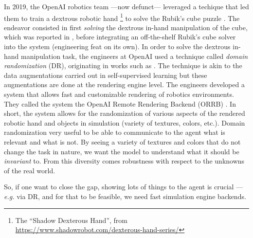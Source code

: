 \documentclass[12pt,a4paper]{article}
\begin{document}
In 2019, the OpenAI robotics team ---now defunct--- leveraged a techique that led
them to train a dextrous robotic hand \footnote{The ``Shadow Dexterous Hand'', from
\url{https://www.shadowrobot.com/dexterous-hand-series/}}
to solve the Rubik's cube puzzle \cite{OpenAI2019-vy}.
The endeavor consisted in first \textit{solving} the dextrous in-hand manipulation of the cube,
which was reported in \cite{OpenAI2018-sm}, before integrating an off-the-shelf Rubik's cube
solver into the system (engineering feat on its own).
In order to solve the dextrous in-hand manipulation task, the engineers at OpenAI used a
technique called \emph{domain randomization} (DR), originating in works such as
\cite{Tobin2017-ir, Tan2018-ux}.
The technique is akin to the data augmentations carried out in self-supervised learning
but these augmentations are done at the rendering engine level. The engineers developed a
system that allows fast and customizable rendering of robotics environments. They called the
system the OpenAI Remote Rendering Backend (ORRB) \cite{Chociej2019-ot}.
In short, the system allows for the randomization of various aspects of the rendered robotic
hand and objects in simulation (variety of textures, colors, etc.).
Domain randomization very useful to be able to communicate to the agent what is relevant and what
is not. By seeing a variety of textures and colors that do not change the task in nature, we
want the model to understand what it should be \emph{invariant} to.
From this diversity comes robustness with respect to the unknowns of the real world.

So, if one want to close the gap, showing lots of things to the agent is crucial
--- \textit{e.g.} via DR, and for that to be feasible, we need fast simulation engine backends.
\end{document}
